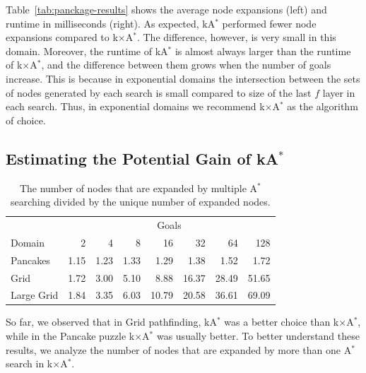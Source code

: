 \documentclass[smallextended]{svjour3}       %
\newcommand{\astar}{A$^*$\xspace}
\newcommand{\kastar}{kA$^*$\xspace}
\newcommand{\kxastar}{k$\times$A$^*$\xspace}
\newcommand{\astari}[1]{A$^*_{#1}$\xspace}
\newcommand{\Exp}{\text{Exp}}
\begin{document}
Table~\ref{tab:panckage-results} shows the average node expansions (left) and runtime in milliseconds (right). As expected, \kastar performed fewer node expansions compared to \kxastar. The difference, however, is very small in this domain. 
Moreover, the runtime of \kastar is almost always larger than the runtime of \kxastar, and the difference between them grows when the number of goals increase.
This is because in exponential domains the intersection between the sets of nodes generated by each search is small compared to size of the last $f$ layer in each search. Thus, in exponential domains we recommend \kxastar as the algorithm of choice. 


\subsection{Estimating the Potential Gain of \kastar}


\begin{table}[!ht]
	\centering
	\begin{tabular}{lrrrrrrr}
\toprule
 &\multicolumn{7}{c}{Goals}\\
\cmidrule(l){2-8}
Domain & 2 & 4 & 8 & 16 & 32 & 64 & 128 \\
\midrule
Pancakes & 1.15 & 1.23 & 1.33 & 1.29 & 1.38 & 1.52 & 1.72 \\
Grid & 1.72 & 3.00 & 5.10 & 8.88 & 16.37 & 28.49 & 51.65 \\
Large Grid & 1.84 & 3.35 & 6.03 & 10.79 & 20.58 & 36.61 & 69.09 \\
\bottomrule
	\end{tabular}
\caption{The number of nodes that are expanded by multiple \astar searching divided by the unique number of expanded nodes.}
\label{tab:potential}
\end{table}




So far, we observed that in Grid pathfinding, \kastar was a better choice than \kxastar, while in the Pancake puzzle \kxastar was usually better. To better understand these results, we analyze the number of nodes that are expanded by more than one \astar search in \kxastar. 
\end{document}
